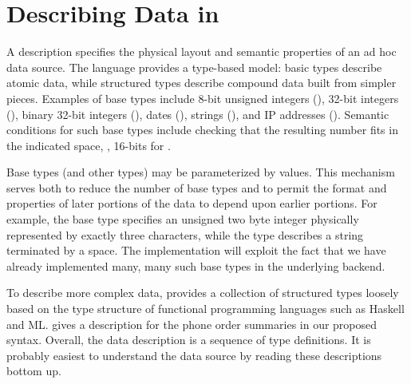 \documentclass{entcs}
\begin{document}
\section{Describing Data in \datatype{}}
\label{sec:data-description}


A \datatype{} description specifies the physical layout and semantic
properties of an ad hoc data source.  The language provides a
type-based model: basic types describe atomic data, while structured
types describe compound data built from simpler pieces.  Examples of
base types include 8-bit unsigned integers (), 32-bit
integers (), binary 32-bit integers (), dates
(), strings (), and IP addresses ().
Semantic conditions for such base types include checking that the
resulting number fits in the indicated space, \ie, 16-bits for
.

Base types (and other types) may be parameterized by values.  This
mechanism serves both to reduce the number of base types and to permit
the format and properties of later portions of the data to depend upon
earlier portions.  For example, the base type 
specifies an unsigned two byte integer physically represented by
exactly three characters, while the type  describes a
string terminated by a space.  The \datatype{} implementation will
exploit the fact that we have already implemented many, many such base
types in the underlying \pads{} backend.

To describe more complex data, \datatype{} provides a collection of
structured types loosely based on the type structure of functional
programming languages such as Haskell and ML.
 gives a \datatype{} description for the
\dibbler{} phone order summaries in our proposed syntax.  Overall, the
data description is a sequence of type definitions.  It is probably
easiest to understand the data source by reading these descriptions
bottom up.
\end{document}
